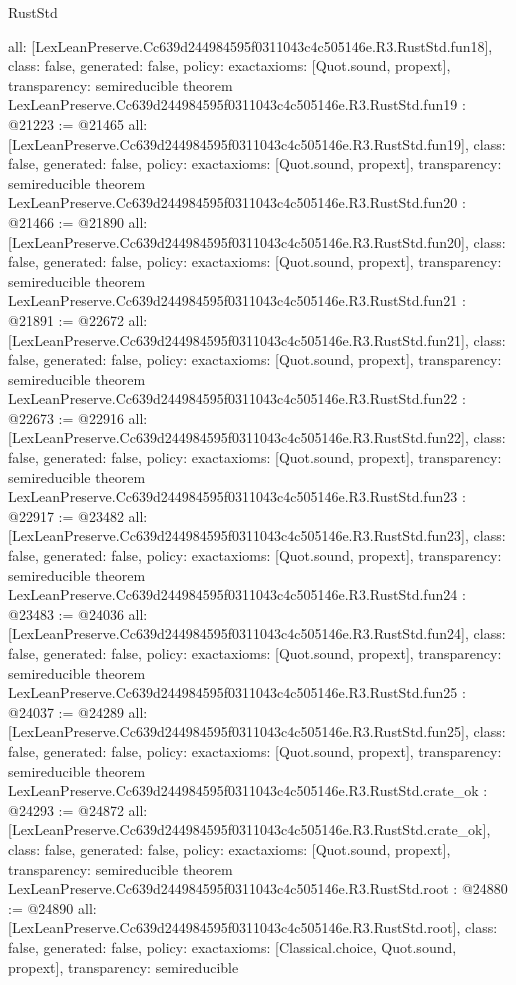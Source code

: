 \begin{lexlean}{RustStd}
\begin{coremodule}
{  all: [LexLeanPreserve.Cc639d244984595f0311043c4c505146e.R3.RustStd.fun18],
  class: false,
  generated: false,
  policy: exact{axioms: [Quot.sound, propext]},
  transparency: semireducible
}
theorem LexLeanPreserve.Cc639d244984595f0311043c4c505146e.R3.RustStd.fun19 : @21223 := @21465 {
  all: [LexLeanPreserve.Cc639d244984595f0311043c4c505146e.R3.RustStd.fun19],
  class: false,
  generated: false,
  policy: exact{axioms: [Quot.sound, propext]},
  transparency: semireducible
}
theorem LexLeanPreserve.Cc639d244984595f0311043c4c505146e.R3.RustStd.fun20 : @21466 := @21890 {
  all: [LexLeanPreserve.Cc639d244984595f0311043c4c505146e.R3.RustStd.fun20],
  class: false,
  generated: false,
  policy: exact{axioms: [Quot.sound, propext]},
  transparency: semireducible
}
theorem LexLeanPreserve.Cc639d244984595f0311043c4c505146e.R3.RustStd.fun21 : @21891 := @22672 {
  all: [LexLeanPreserve.Cc639d244984595f0311043c4c505146e.R3.RustStd.fun21],
  class: false,
  generated: false,
  policy: exact{axioms: [Quot.sound, propext]},
  transparency: semireducible
}
theorem LexLeanPreserve.Cc639d244984595f0311043c4c505146e.R3.RustStd.fun22 : @22673 := @22916 {
  all: [LexLeanPreserve.Cc639d244984595f0311043c4c505146e.R3.RustStd.fun22],
  class: false,
  generated: false,
  policy: exact{axioms: [Quot.sound, propext]},
  transparency: semireducible
}
theorem LexLeanPreserve.Cc639d244984595f0311043c4c505146e.R3.RustStd.fun23 : @22917 := @23482 {
  all: [LexLeanPreserve.Cc639d244984595f0311043c4c505146e.R3.RustStd.fun23],
  class: false,
  generated: false,
  policy: exact{axioms: [Quot.sound, propext]},
  transparency: semireducible
}
theorem LexLeanPreserve.Cc639d244984595f0311043c4c505146e.R3.RustStd.fun24 : @23483 := @24036 {
  all: [LexLeanPreserve.Cc639d244984595f0311043c4c505146e.R3.RustStd.fun24],
  class: false,
  generated: false,
  policy: exact{axioms: [Quot.sound, propext]},
  transparency: semireducible
}
theorem LexLeanPreserve.Cc639d244984595f0311043c4c505146e.R3.RustStd.fun25 : @24037 := @24289 {
  all: [LexLeanPreserve.Cc639d244984595f0311043c4c505146e.R3.RustStd.fun25],
  class: false,
  generated: false,
  policy: exact{axioms: [Quot.sound, propext]},
  transparency: semireducible
}
theorem LexLeanPreserve.Cc639d244984595f0311043c4c505146e.R3.RustStd.crate_ok : @24293 := @24872 {
  all: [LexLeanPreserve.Cc639d244984595f0311043c4c505146e.R3.RustStd.crate_ok],
  class: false,
  generated: false,
  policy: exact{axioms: [Quot.sound, propext]},
  transparency: semireducible
}
theorem LexLeanPreserve.Cc639d244984595f0311043c4c505146e.R3.RustStd.root : @24880 := @24890 {
  all: [LexLeanPreserve.Cc639d244984595f0311043c4c505146e.R3.RustStd.root],
  class: false,
  generated: false,
  policy: exact{axioms: [Classical.choice, Quot.sound, propext]},
  transparency: semireducible
}


\end{coremodule}
\end{lexlean}
